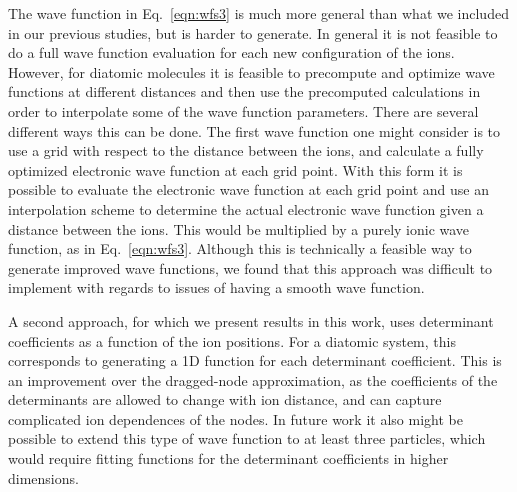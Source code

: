 \documentclass[aip,jcp,numerical,reprint]{revtex4-1}
\begin{document}
The wave function in Eq.~\eqref{eqn:wfs3} is much more general than what we included in our previous studies, but is harder to generate.  In general it is not feasible to do a full wave function evaluation for each new configuration of the ions.  However, for diatomic molecules it is feasible to precompute and optimize wave functions at different distances and then use the precomputed calculations in order to interpolate some of the  wave function parameters.  There are several different ways this can be done.   The first wave function one might consider is to use a grid with respect to the distance between the ions, and calculate a fully optimized electronic wave function at each grid point.  With this form it is possible to evaluate the electronic wave function at each grid point and use an interpolation scheme to determine the actual electronic wave function given a distance between the ions.  This would be multiplied by a purely ionic wave function, as in Eq.~\eqref{eqn:wfs3}. Although this is technically a feasible way to generate improved wave functions,  we found that this approach was difficult to implement with regards to issues of having a smooth wave function.   

A second approach, for which we present results in this work, uses determinant coefficients as a function of the ion positions.  For a diatomic system, this corresponds to generating a 1D function for each determinant coefficient.  This is an improvement over the dragged-node approximation, as the coefficients of the determinants are allowed to change with ion distance, and can capture complicated ion dependences of the nodes.  In future work it also might be possible to extend this type of wave function to at least three particles, which would require fitting functions for the determinant coefficients in higher dimensions.  





\end{document}
